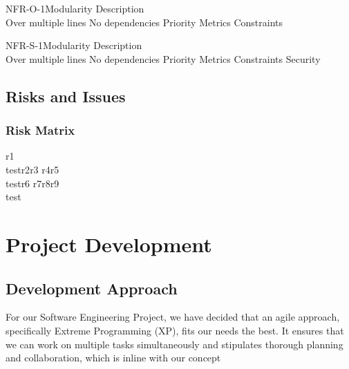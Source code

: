\documentclass[coverpage,lineno]{../custom}
\begin{document}
\NonFunctionalReq
{NFR-O-1}{Modularity}
{Description\\Over multiple lines}
{No dependencies}
{Priority}
{Metrics}
{Constraints}

\NonFunctionalReqS
{NFR-S-1}{Modularity}
{Description\\Over multiple lines}
{No dependencies}
{Priority}
{Metrics}
{Constraints}
{Security}

\subsection{Risks and Issues}
\label{ssec:risks}

\subsubsection{Risk Matrix}

\RiskMatrix
{r1\\test}{r2}{r3}
{r4}{r5\\test}{r6}
{r7}{r8}{r9\\test}

\section{Project Development}
\label{sec:dev}

\subsection{Development Approach}
\label{ssec:dev_approach}
For our Software Engineering Project, we have decided that an agile approach, specifically Extreme Programming (XP), fits our needs the best. It ensures that we can work on multiple tasks simultaneously and stipulates thorough planning and collaboration, which is inline with our concept
\end{document}
